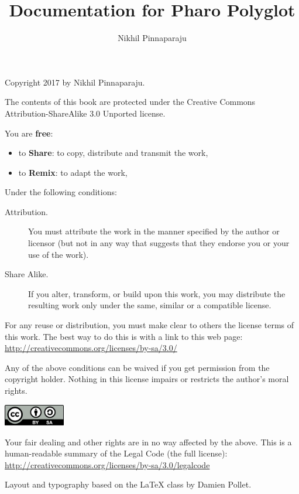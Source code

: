 \documentclass[10pt,twoside,english]{_support/latex/sbabook/sbabook}
\title{Documentation for Pharo Polyglot}
\author{Nikhil Pinnaparaju}
\begin{document}
\maketitle
\pagestyle{titlingpage}
\thispagestyle{titlingpage} %

\cleartoverso
{\small

  Copyright 2017 by Nikhil Pinnaparaju.

  The contents of this book are protected under the Creative Commons
  Attribution-ShareAlike 3.0 Unported license.

  You are \textbf{free}:
  \begin{itemize}
  \item to \textbf{Share}: to copy, distribute and transmit the work,
  \item to \textbf{Remix}: to adapt the work,
  \end{itemize}

  Under the following conditions:
  \begin{description}
  \item[Attribution.] You must attribute the work in the manner specified by the
    author or licensor (but not in any way that suggests that they endorse you
    or your use of the work).
  \item[Share Alike.] If you alter, transform, or build upon this work, you may
    distribute the resulting work only under the same, similar or a compatible
    license.
  \end{description}

  For any reuse or distribution, you must make clear to others the
  license terms of this work. The best way to do this is with a link to
  this web page: \\
  \url{http://creativecommons.org/licenses/by-sa/3.0/}

  Any of the above conditions can be waived if you get permission from
  the copyright holder. Nothing in this license impairs or restricts the
  author's moral rights.

  \begin{center}
    \includegraphics[width=0.2\textwidth]{_support/latex/sbabook/CreativeCommons-BY-SA.pdf}
  \end{center}

  Your fair dealing and other rights are in no way affected by the
  above. This is a human-readable summary of the Legal Code (the full
  license): \\
  \url{http://creativecommons.org/licenses/by-sa/3.0/legalcode}

  \vfill

  Layout and typography based on the  \LaTeX{} class by Damien
  Pollet.
}
\end{document}

